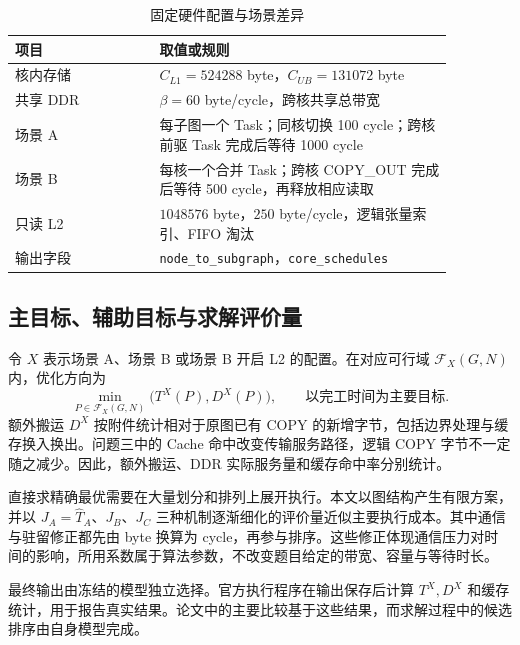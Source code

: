 \begin{table}[htbp]
\centering
\caption{固定硬件配置与场景差异}
\label{tab:hardware}
\begin{tabular}{p{0.29\linewidth}p{0.58\linewidth}}
\hline
项目 & 取值或规则 \\
\hline
核内存储 & $C_{L1}=524288$ byte，$C_{UB}=131072$ byte \\
共享 DDR & $\beta=60$ byte/cycle，跨核共享总带宽 \\
场景 A & 每子图一个 Task；同核切换 100 cycle；跨核前驱 Task 完成后等待 1000 cycle \\
场景 B & 每核一个合并 Task；跨核 COPY\_OUT 完成后等待 500 cycle，再释放相应读取 \\
只读 L2 & $1048576$ byte，$250$ byte/cycle，逻辑张量索引、FIFO 淘汰 \\
输出字段 & \texttt{node\_to\_subgraph}，\texttt{core\_schedules} \\
\hline
\end{tabular}
\end{table}

\subsection{主目标、辅助目标与求解评价量}
令 $X$ 表示场景 A、场景 B 或场景 B 开启 L2 的配置。在对应可行域 $\mathcal F_X(G,N)$ 内，优化方向为
\begin{equation}
\min_{P\in\mathcal F_X(G,N)}\big(T^{X}(P),D^{X}(P)\big),
\qquad \text{以完工时间为主要目标}.
\label{eq:objective}
\end{equation}
额外搬运 $D^X$ 按附件统计相对于原图已有 COPY 的新增字节，包括边界处理与缓存换入换出。问题三中的 Cache 命中改变传输服务路径，逻辑 COPY 字节不一定随之减少。因此，额外搬运、DDR 实际服务量和缓存命中率分别统计。

直接求精确最优需要在大量划分和排列上展开执行。本文以图结构产生有限方案，并以 $J_A=\widehat T_A$、$J_B$、$J_C$ 三种机制逐渐细化的评价量近似主要执行成本。其中通信与驻留修正都先由 byte 换算为 cycle，再参与排序。这些修正体现通信压力对时间的影响，所用系数属于算法参数，不改变题目给定的带宽、容量与等待时长。

最终输出由冻结的模型独立选择。官方执行程序在输出保存后计算 $T^X,D^X$ 和缓存统计，用于报告真实结果。论文中的主要比较基于这些结果，而求解过程中的候选排序由自身模型完成。
